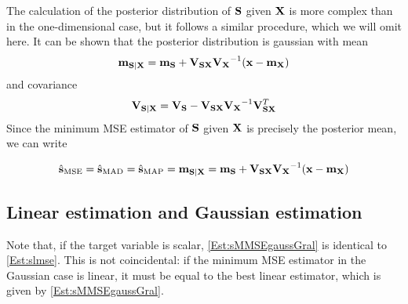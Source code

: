 {The calculation of the posterior distribution of ${\bf S}$ given ${\bf X}$ is more complex than in the one-dimensional case, but it follows a similar procedure, which we will omit here. It can be shown that the posterior distribution is gaussian with mean
\begin{align}
{\bf m}_{{\bf S}|{\bf X}} 
      = {\bf m}_{\bf S} + {\bf V}_{\bf SX}{\bf V_X}^{-1}({\bf x}-{\bf m}_{\bf X}) 
\label{Est:sMMSEgaussMN}
\end{align}
and covariance
\begin{align}
{\bf V}_{{\bf S}|{\bf X}} 
      = {\bf V_S}- {\bf V}_{\bf SX}{\bf V_X}^{-1}{\bf V}_{\bf SX}^T
\end{align}
Since the minimum MSE estimator of ${\bf S}$ given ${\bf X}$ is precisely the posterior mean, we can write
\begin{framed}
\begin{align}
\hat{\bf s}_{\text{MSE}} = \hat{\bf s}_{\text{MAD}} = \hat{\bf s}_{\text{MAP}} = 
{\bf m}_{{\bf S}|{\bf X}} = {\bf m}_{\bf S} + {\bf V}_{\bf SX}{\bf V_X}^{-1}({\bf x}-{\bf m}_{\bf X}) 
\label{Est:sMMSEgaussGral}
\end{align}
\end{framed}

\subsection{Linear estimation and Gaussian estimation}

{Note that, if the target variable is scalar, \eqref{Est:sMMSEgaussGral} is identical to \eqref{Est:slmse}. This is not coincidental: if the minimum MSE estimator in the Gaussian case is linear, it must be equal to the best linear estimator, which is given by \eqref{Est:sMMSEgaussGral}.}

}
